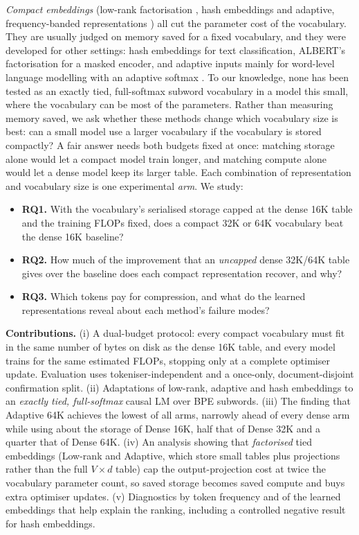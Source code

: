 \documentclass[10pt,a4paper]{article}
\newcommand{\bpb}{\text{BPB}}
\begin{document}
\emph{Compact embeddings} (low-rank factorisation \citep{lan2020albert}, hash embeddings
\citep{svenstrup2017hash} and adaptive, frequency-banded representations \citep{baevski2019adaptive}) all
cut the parameter cost of the vocabulary. They are usually judged on memory saved for a fixed
vocabulary, and they were developed for other settings: hash embeddings for text classification, ALBERT's
factorisation for a masked encoder, and adaptive inputs mainly for word-level language modelling with an
adaptive softmax \citep{grave2017adaptivesoftmax}. To our knowledge, none has been tested as an exactly
tied, full-softmax subword vocabulary in a model this small, where the vocabulary can be most of the
parameters. Rather than measuring memory saved, we ask whether these methods change which vocabulary size
is best: can a small model use a larger vocabulary if the vocabulary is stored compactly? A fair answer
needs both budgets fixed at once: matching storage alone would let a compact model train longer, and
matching compute alone would let a dense model keep its larger table. Each combination of representation
and vocabulary size is one experimental \emph{arm}. We study:
\begin{itemize}
  \item \textbf{RQ1.} With the vocabulary's serialised storage capped at the dense 16K table and the
  training FLOPs fixed, does a compact 32K or 64K vocabulary beat the dense 16K baseline?
  \item \textbf{RQ2.} How much of the improvement that an \emph{uncapped} dense 32K/64K table gives over the
  baseline does each compact representation recover, and why?
  \item \textbf{RQ3.} Which tokens pay for compression, and what do the learned representations reveal
  about each method's failure modes?
\end{itemize}

\textbf{Contributions.} (i) A dual-budget protocol: every compact vocabulary must fit in the same number of
bytes on disk as the dense 16K table, and every model trains for the same estimated FLOPs, stopping only at a
complete optimiser update. Evaluation uses tokeniser-independent \bpb{} and a once-only, document-disjoint
confirmation split. (ii) Adaptations of low-rank, adaptive and hash embeddings to an \emph{exactly tied,
full-softmax} causal LM over BPE subwords. (iii) The finding that Adaptive 64K achieves the lowest \bpb{} of
all arms, narrowly ahead of every dense arm while using about the storage of Dense 16K, half that of Dense 32K
and a quarter that of Dense 64K. (iv) An analysis showing that \emph{factorised} tied embeddings (Low-rank and
Adaptive, which store small tables plus projections rather than the full $V\times d$ table) cap the
output-projection cost at twice the vocabulary parameter count, so saved storage becomes saved compute and buys
extra optimiser updates. (v) Diagnostics by token frequency and of the learned embeddings that help explain
the ranking, including a controlled negative result for hash embeddings.
\end{document}
